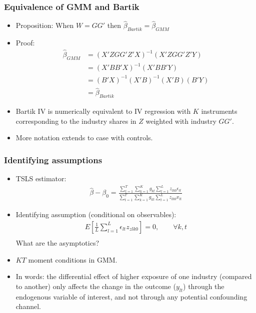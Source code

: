 \documentclass[english,xcolor=svgnames]{beamer}
\begin{document}
\begin{frame}
\frametitle[alignment=center]{Equivalence of GMM and Bartik}
\begin{itemize}
	\item Proposition: When $W = GG'$ then $\hat{\beta}_{Bartik} = \hat{\beta}_{GMM}$
	\item Proof:
	\begin{align*}
		\hat{\beta}_{GMM} &= (X'Z GG' Z'X)^{-1}(X'Z GG' Z'Y) \\
		&=(X'BB'X)^{-1}(X'BB'Y) \\
		&=(B'X)^{-1}(X'B)^{-1}(X'B)(B'Y)\\
		&=\hat{\beta}_{Bartik}
	\end{align*}
	\item Bartik IV is numerically equivalent to IV regression with $K$ instruments corresponding to the industry shares in $Z$ weighted with industry $GG'$.
	\item More notation extends to case with controls.
\end{itemize}
\end{frame}


\begin{frame}
\frametitle[alignment=center]{Identifying assumptions}
\begin{itemize}
	\item TSLS estimator:
	\begin{align*}
		\hat{\beta} - \beta_0 = \frac{\sum_{t=1}^{T}\sum_{k=1}^K g_{kt} \sum_{l=1}^{L}z_{lk0} \epsilon_{lt}}{\sum_{t=1}^{T}\sum_{k=1}^K g_{kt} \sum_{l=1}^{L}z_{lk0} x_{lt}}
	\end{align*}
	\item Identifying assumption (conditional on observables):
	\begin{align*}
		E\left[\frac{1}{L}\sum_{l=1}^{L}\epsilon_{lt}z_{zlk0}\right] =0,\qquad \forall k, t \\
	\end{align*}
	What are the asymptotics?
	\item $KT$ moment conditions in GMM.
	\item In words: the differential effect of higher exposure of one industry (compared to another) only affects the change in the outcome ($y_{lt}$) through the endogenous variable of interest, and not through any potential confounding channel.
\end{itemize}
\end{frame}
\end{document}
